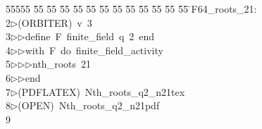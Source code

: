 %
%
\begin{tabbing}
55555 \= 55 \= 55 \= 55 \= 55 \= 55 \= 55 \= 55 \= 55 \= 55 \= 55 \= 55 \= 55 \= \>F64\_roots\_21:\\[0pt]
2\>$\triangleright$\>(ORBITER)\ v\ 3\ \\[0pt]
3\>$\triangleright$\>$\triangleright$\>define\ F\ finite\_field\ q\ 2\ end\ \\[0pt]
4\>$\triangleright$\>$\triangleright$\>with\ F\ do\ finite\_field\_activity\ \\[0pt]
5\>$\triangleright$\>$\triangleright$\>$\triangleright$\>nth\_roots\ 21\ \\[0pt]
6\>$\triangleright$\>$\triangleright$\>end\\[0pt]
7\>$\triangleright$\>(PDFLATEX)\ Nth\_roots\_q2\_n21tex\\[0pt]
8\>$\triangleright$\>(OPEN)\ Nth\_roots\_q2\_n21pdf\\[0pt]
9\>\end{tabbing}
